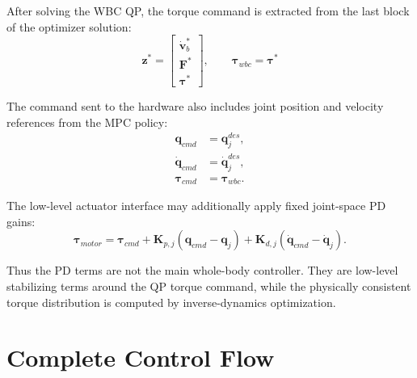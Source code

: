 \documentclass[11pt,a4paper]{article}
\begin{document}
After solving the WBC QP, the torque command is extracted from the last block of the optimizer solution:
\begin{equation}
	\bm{z}^{*}
	=
	\begin{bmatrix}
		\dot{\bm{v}}_b^{*}\\
		\bm{F}^{*}\\
		\bm{\tau}^{*}
	\end{bmatrix},
	\qquad
	\boxed{
		\bm{\tau}_{wbc}
		=
		\bm{\tau}^{*}
	}
\end{equation}

The command sent to the hardware also includes joint position and velocity references from the MPC policy:
\begin{align}
	\bm{q}_{cmd} &= \bm{q}_j^{des},\\
	\dot{\bm{q}}_{cmd} &= \dot{\bm{q}}_j^{des},\\
	\bm{\tau}_{cmd} &= \bm{\tau}_{wbc}.
\end{align}

The low-level actuator interface may additionally apply fixed joint-space PD gains:
\begin{equation}
	\bm{\tau}_{motor}
	=
	\bm{\tau}_{cmd}
	+
	\bm{K}_{p,j}
	(\bm{q}_{cmd}-\bm{q}_j)
	+
	\bm{K}_{d,j}
	(\dot{\bm{q}}_{cmd}-\dot{\bm{q}}_j).
\end{equation}

Thus the PD terms are not the main whole-body controller. They are low-level stabilizing terms around the QP torque command, while the physically consistent torque distribution is computed by inverse-dynamics optimization.


\section{Complete Control Flow}
\end{document}
